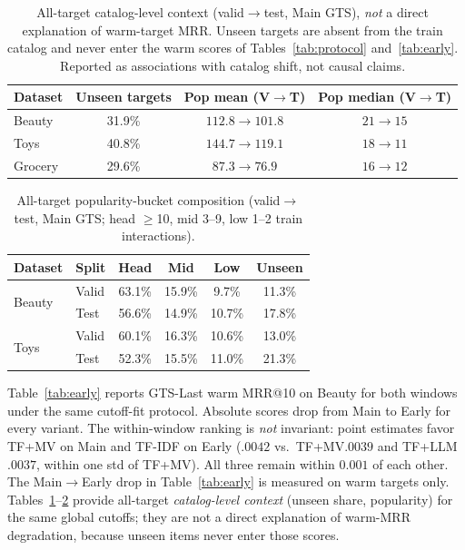 \documentclass[sigconf,natbib=true,anonymous]{acmart}
\newcommand{\tfidf}{\textsc{TF-IDF}\xspace}
\newcommand{\tfllm}{\textsc{TF+LLM}\xspace}
\newcommand{\tfmv}{\textsc{TF+MV}\xspace}
\begin{document}
\begin{table}[t]
\centering
\caption{%
All-target catalog-level context (valid$\to$test, Main GTS), \emph{not} a direct explanation of warm-target MRR.
Unseen targets are absent from the train catalog and never enter the warm scores of Tables~\ref{tab:protocol} and~\ref{tab:early}.
Reported as associations with catalog shift, not causal claims.%
}
\label{tab:shift}
\small
\setlength{\tabcolsep}{4pt}
\begin{tabular}{@{}lccc@{}}
\toprule
Dataset & Unseen targets & Pop mean (V$\to$T) & Pop median (V$\to$T) \\
\midrule
Beauty  & 31.9\% & $112.8 \to 101.8$ & $21 \to 15$ \\
Toys    & 40.8\% & $144.7 \to 119.1$ & $18 \to 11$ \\
Grocery & 29.6\% & $87.3 \to 76.9$ & $16 \to 12$ \\
\bottomrule
\end{tabular}
\end{table}

\begin{table}[t]
\centering
\caption{%
All-target popularity-bucket composition (valid$\to$test, Main GTS; head $\ge$10, mid 3--9, low 1--2 train interactions).%
}
\label{tab:bucket}
\small
\setlength{\tabcolsep}{3.5pt}
\begin{tabular}{@{}llcccc@{}}
\toprule
Dataset & Split & Head & Mid & Low & Unseen \\
\midrule
\multirow{2}{*}{Beauty}
 & Valid & 63.1\% & 15.9\% & 9.7\% & 11.3\% \\
 & Test  & 56.6\% & 14.9\% & 10.7\% & 17.8\% \\
\midrule
\multirow{2}{*}{Toys}
 & Valid & 60.1\% & 16.3\% & 10.6\% & 13.0\% \\
 & Test  & 52.3\% & 15.5\% & 11.0\% & 21.3\% \\
\bottomrule
\end{tabular}
\end{table}

Table~\ref{tab:early} reports GTS-Last warm MRR@10 on Beauty for both windows under the same cutoff-fit protocol.
Absolute scores drop from Main to Early for every variant.
The within-window ranking is \emph{not} invariant: point estimates favor \tfmv on Main and \tfidf on Early ($.0042$ vs.\ \tfmv $.0039$ and \tfllm $.0037$, within one std of \tfmv).
All three remain within $0.001$ of each other.
The Main$\to$Early drop in Table~\ref{tab:early} is measured on warm targets only.
Tables~\ref{tab:shift}--\ref{tab:bucket} provide all-target \emph{catalog-level context} (unseen share, popularity) for the same global cutoffs; they are not a direct explanation of warm-MRR degradation, because unseen items never enter those scores.
\end{document}
